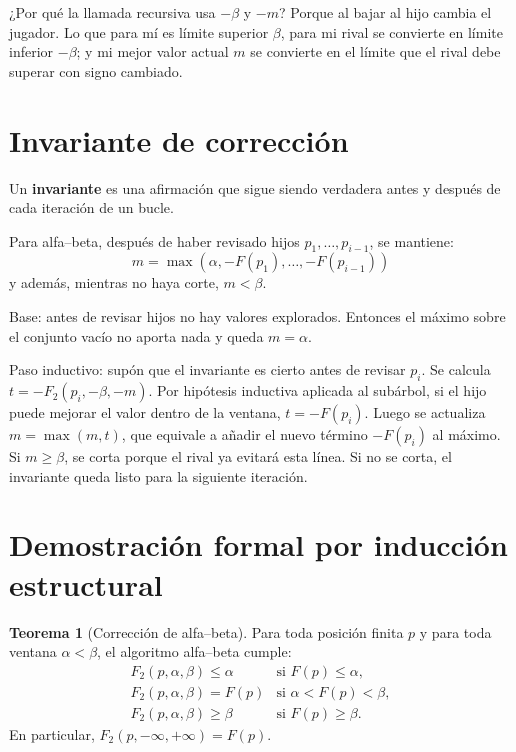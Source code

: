 \documentclass[11pt,a4paper]{article}
\theoremstyle{definition}
\newtheorem{theorem}{Teorema}[section]
\begin{document}
¿Por qué la llamada recursiva usa $-\beta$ y $-m$? Porque al bajar al hijo cambia el jugador. Lo que para mí es límite superior $\beta$, para mi rival se convierte en límite inferior $-\beta$; y mi mejor valor actual $m$ se convierte en el límite que el rival debe superar con signo cambiado.

\section{Invariante de corrección}

Un \textbf{invariante} es una afirmación que sigue siendo verdadera antes y después de cada iteración de un bucle.

Para alfa--beta, después de haber revisado hijos $p_1,\ldots,p_{i-1}$, se mantiene:
\[
 m = \max(\alpha, -F(p_1),\ldots,-F(p_{i-1}))
\]
y además, mientras no haya corte, $m<\beta$.

\begin{proofbox}
Base: antes de revisar hijos no hay valores explorados. Entonces el máximo sobre el conjunto vacío no aporta nada y queda $m=\alpha$.

Paso inductivo: supón que el invariante es cierto antes de revisar $p_i$. Se calcula $t=-F_2(p_i,-\beta,-m)$. Por hipótesis inductiva aplicada al subárbol, si el hijo puede mejorar el valor dentro de la ventana, $t=-F(p_i)$. Luego se actualiza $m=\max(m,t)$, que equivale a añadir el nuevo término $-F(p_i)$ al máximo. Si $m\ge\beta$, se corta porque el rival ya evitará esta línea. Si no se corta, el invariante queda listo para la siguiente iteración.
\end{proofbox}

\section{Demostración formal por inducción estructural}

\begin{theorem}[Corrección de alfa--beta]
Para toda posición finita $p$ y para toda ventana $\alpha<\beta$, el algoritmo alfa--beta cumple:
\[
\begin{array}{ll}
F_2(p,\alpha,\beta)\le\alpha & \text{si }F(p)\le\alpha,\\
F_2(p,\alpha,\beta)=F(p) & \text{si }\alpha<F(p)<\beta,\\
F_2(p,\alpha,\beta)\ge\beta & \text{si }F(p)\ge\beta.
\end{array}
\]
En particular, $F_2(p,-\infty,+\infty)=F(p)$.
\end{theorem}
\end{document}
